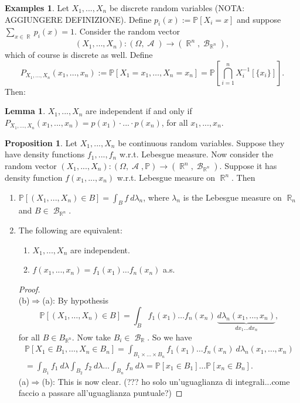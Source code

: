 \documentclass[12pt,a4paper]{report}
\theoremstyle{definition}
\newtheorem{lemma}[theorem]{Lemma}
\newtheorem{proposition}[theorem]{Proposition}
\newtheorem*{examples}{Examples}
\theoremstyle{num.custom-title}
\DeclareMathOperator{\A}{\mathcal{A}}
\DeclareMathOperator{\B}{\mathcal{B}}
\DeclareMathOperator{\R}{\mathbb{R}}
\DeclareMathOperator{\imp}{\Rightarrow}
\renewcommand{\1}{\mathbbm{1}}
\renewcommand{\P}{\mathbb{P}}
\begin{document}
\begin{examples}
Let $X_1,...,X_n$ be discrete random variables (NOTA: AGGIUNGERE DEFINIZIONE). Define $p_i(x) := \P[X_i=x]$ and suppose $\sum_{x \in \R} p_i(x) = 1$. Consider the random vector
\[
(X_1,\ldots,X_n) : (\Omega,\A) \to (\R^n,\B_{\R^n}),
\]
which of course is discrete as well. Define
\[
P_{X_1,\ldots,X_n}(x_1,\ldots,x_n) := \P[X_1=x_1,\ldots,X_n=x_n] = \P \left[ \bigcap_{i=1}^n X_i^{-1}[\{x_i\}] \right].
\]
Then:
\begin{lemma}
$X_1,...,X_n$ are independent if and only if $P_{X_1,...,X_n}(x_1,...,x_n)=p(x_1) \cdot ... \cdot p(x_n)$, for all $x_1,...,x_n$.
\end{lemma}
\end{examples}
\begin{proposition}
Let $X_1,...,X_n$ be continuous random variables. Suppose they have density functions $f_1,...,f_n$ w.r.t. Lebesgue measure. Now consider the random vector $(X_1,...,X_n) \colon (\Omega,\A,\P) \to (\R^n, \B_{\R^n})$. Suppose it has density function $f(x_1,...,x_n)$ w.r.t. Lebesgue measure on $\R^n$. Then
\begin{enumerate}
\item $\P[(X_1,...,X_n) \in B] = \int_B f \ d\lambda_n$, where $\lambda_n$ is the Lebesgue measure on $\R_n$ and $B \in \B_{\R^n}$.
\item  The following are equivalent:
\begin{enumerate}
\item $X_1,...,X_n$ are independent.
\item $f(x_1,...,x_n)=f_1(x_1) \ldots f_n(x_n)$ a.s.
\end{enumerate}
\begin{proof}\ \\
(b)$\imp$(a): By hypothesis
\[
\P[(X_1,\ldots,X_n) \in B] = \int_B f_1(x_1) \ldots f_n(x_n) \ \underbrace{d\lambda_n(x_1,\ldots,x_n)}_{dx_1 \ldots dx_n},
\]
for all $B \in B_{\R^n}$. Now take $B_i \in \B_{\R}$. So we have
\begin{multline*}
\P[X_1 \in B_1, \ldots, X_n \in B_n] = \int_{B_1 \times \ldots \times B_n} f_1(x_1) \ldots f_n(x_n) \ d\lambda_n(x_1,\ldots,x_n) \\ 
= \int_{B_1} f_1 \ d\lambda \int_{B_2} f_2 \ d\lambda \ldots \int_{B_n} f_n \ d\lambda = \P[x_1 \in B_1] \ldots \P[x_n \in B_n].
\end{multline*}
(a)$\imp$(b): This is now clear. (??? ho solo un'uguaglianza di integrali...come faccio a passare all'uguaglianza puntuale?)
\end{proof}
\end{enumerate}
\end{proposition}
\end{document}

